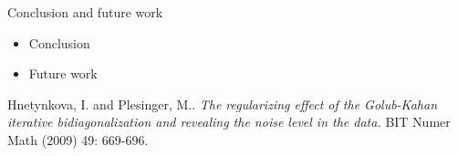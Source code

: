 \documentclass{beamer}
\begin{document}
\begin{frame}{Conclusion and future work}
  \begin{itemize}
    \item Conclusion

    \item Future work
  \end{itemize}
\end{frame}

\begin{thebibliography}{1}
    Hnetynkova, I. and Plesinger, M.. 
    \emph{The regularizing effect of the Golub-Kahan iterative bidiagonalization 
      and revealing the noise level in the data.}
      BIT Numer Math (2009) 49: 669-696.
\end{thebibliography}
\end{document}
